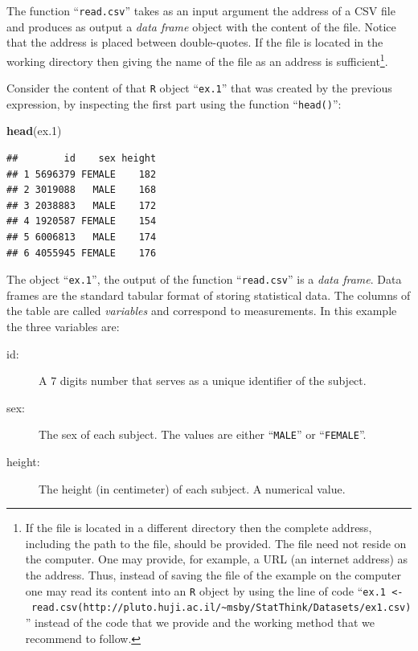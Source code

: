 \documentclass[]{krantz}
\makeatletter
\newenvironment{Shaded}{\begin{snugshade}}{\end{snugshade}}
\newcommand{\KeywordTok}[1]{\textcolor[rgb]{0.13,0.29,0.53}{\textbf{#1}}}
\newcommand{\DecValTok}[1]{\textcolor[rgb]{0.00,0.00,0.81}{#1}}
\newcommand{\NormalTok}[1]{#1}
\newenvironment{kframe}{%
\medskip{}
\setlength{\fboxsep}{.8em}
 \def\at@end@of@kframe{}%
 \ifinner\ifhmode%
  \def\at@end@of@kframe{\end{minipage}}%
  \begin{minipage}{\columnwidth}%
 \fi\fi%
 \def\FrameCommand##1{\hskip\@totalleftmargin \hskip-\fboxsep
 \colorbox{shadecolor}{##1}\hskip-\fboxsep
     \hskip-\linewidth \hskip-\@totalleftmargin \hskip\columnwidth}%
 \MakeFramed {\advance\hsize-\width
   \@totalleftmargin\z@ \linewidth\hsize
   \@setminipage}}%
 {\par\unskip\endMakeFramed%
 \at@end@of@kframe}
\renewenvironment{Shaded}{\begin{kframe}}{\end{kframe}}
\theoremstyle{definition}
\theoremstyle{definition}
\theoremstyle{definition}
\theoremstyle{remark}
\makeatother
\begin{document}
The function ``\texttt{read.csv}'' takes as an input argument the
address of a CSV file and produces as output a \emph{data frame} object
with the content of the file. Notice that the address is placed between
double-quotes. If the file is located in the working directory then
giving the name of the file as an address is sufficient\footnote{If the
  file is located in a different directory then the complete address,
  including the path to the file, should be provided. The file need not
  reside on the computer. One may provide, for example, a URL (an
  internet address) as the address. Thus, instead of saving the file of
  the example on the computer one may read its content into an
  \texttt{R} object by using the line of code
  ``\texttt{ex.1\ \textless{}-\ read.csv(http://pluto.huji.ac.il/\textasciitilde{}msby/StatThink/Datasets/ex1.csv)}''
  instead of the code that we provide and the working method that we
  recommend to follow.}.

Consider the content of that \texttt{R} object ``\texttt{ex.1}'' that
was created by the previous expression, by inspecting the first part
using the function ``\texttt{head()}'':

\begin{Shaded}
\begin{Highlighting}[]
\KeywordTok{head}\NormalTok{(ex.}\DecValTok{1}\NormalTok{)}
\end{Highlighting}
\end{Shaded}

\begin{verbatim}
##        id    sex height
## 1 5696379 FEMALE    182
## 2 3019088   MALE    168
## 3 2038883   MALE    172
## 4 1920587 FEMALE    154
## 5 6006813   MALE    174
## 6 4055945 FEMALE    176
\end{verbatim}

The object ``\texttt{ex.1}'', the output of the function
``\texttt{read.csv}'' is a \emph{data frame}. Data frames are the
standard tabular format of storing statistical data. The columns of the
table are called \emph{variables} and correspond to measurements. In
this example the three variables are:

\begin{description}
\item[id:]
A 7 digits number that serves as a unique identifier of the subject.
\item[sex:]
The sex of each subject. The values are either ``\texttt{MALE}'' or
``\texttt{FEMALE}''.
\item[height:]
The height (in centimeter) of each subject. A numerical value.
\end{description}
\end{document}
